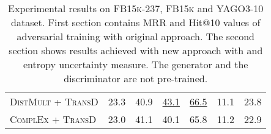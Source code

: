 \begin{table}[H]
\begin{tabular}{lllllll}
          \textsc{DistMult} + \textsc{TransD}
          & 23.3 
          & 40.9  
           & \underline{43.1} 
           & \underline{66.5}
           & 11.1
           & 23.8\\
        
         \textsc{ComplEx} + \textsc{TransD}
          & 23.0  
          & 41.1  
             & 40.1 
             & 65.8
             & 11.2
             & 22.9\\
          
        \bottomrule
    \end{tabular}
    \caption{Experimental results on \textsc{FB15k-237}, \textsc{FB15k} and \textsc{YAGO3-10} dataset.
    First section contains MRR and Hit@10 values of adversarial training with original \kbgan approach.
    The second section shows results achieved with new approach \usgan with \ussoftmax and entropy uncertainty measure.
    The generator and the discriminator are not pre-trained.}
\label{tab:result_table3}
\end{table}